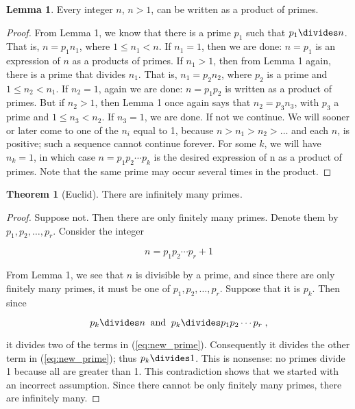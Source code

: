 \documentclass{article}
\theoremstyle{definition} %
\newtheorem{theorem}{Theorem}[section] %
\theoremstyle{definition}
\theoremstyle{definition}
\newtheorem{lemma}{Lemma}[section]
\theoremstyle{definition}
\begin{document}
  \begin{lemma}
    Every integer $n$, $n > 1$, can be written as a product of primes.
    \label{lem:integer_is_a_product_of_primes}
  \end{lemma}
  
  \begin{proof}
    From Lemma 1, we know that there is a prime $p_1$ such that $p_1 \divides n$. That is, $n = p_1n_1$,
    where $1 \leq n_1 < n$. If $n_1 = 1$, then we are done: $n = p_1$ is an expression of $n$ as a products of
    primes. If $n_1 > 1$, then from Lemma 1 again, there is a prime that divides $n_1$. That is, $n_1 = p_2n_2$,
    where $p_2$ is a prime and $1 \leq n_2 < n_1$. If $n_2 = 1$, again we are done: $n = p_1p_2$ is written as a 
    product of primes. But if $n_2 > 1$, then Lemma 1 once again says that $n_2 = p_3n_3$, with $p_3$ a prime
    and $1 \leq n_3 < n_2$. If $n_3 = 1$, we are done. If not we continue. We will sooner or later come to one of the
    $n_i$ equal to 1, because $n > n_1 > n_2 > \dots$ and each $n$, is positive; such a sequence cannot continue forever.
    For some $k$, we will have $n_k = 1$, in which case $n = p_1p_2 \cdots p_k$ is the desired expression of n as
    a product of primes. Note that the same prime may occur several times in the product.
  \end{proof}
  
  \begin{theorem}[Euclid]
    There are infinitely many primes.
  \end{theorem}
  
  \begin{proof}
    Suppose not. Then there are only finitely many primes. Denote them by $p_1, p_2, \dots, p_r$. Consider
    the integer
    
    \begin{equation}
      n = p_1p_2\cdots p_r + 1
      \label{eq:new_prime}
    \end{equation}
    
    From Lemma 1, we see that $n$ is divisible by a prime, and since there are only finitely many primes, it
    must be one of $p_1, p_2, \dots, p_r$. Suppose that it is $p_k$. Then since
    
    \begin{equation*}
      p_k \divides n \;\;\text{and}\;\; p_k \divides p_1p_2\cdots p_r\;\text{,}
    \end{equation*}
    
    it divides two of the terms in (\ref{eq:new_prime}). Consequently it divides the other term in (\ref{eq:new_prime}); thus $p_k \divides 1$.
    This is nonsense: no primes divide 1 because all are greater than 1. This contradiction shows that
    we started with an incorrect assumption. Since there cannot be only finitely many primes, there
    are infinitely many.
  \end{proof}
  
\end{document}

